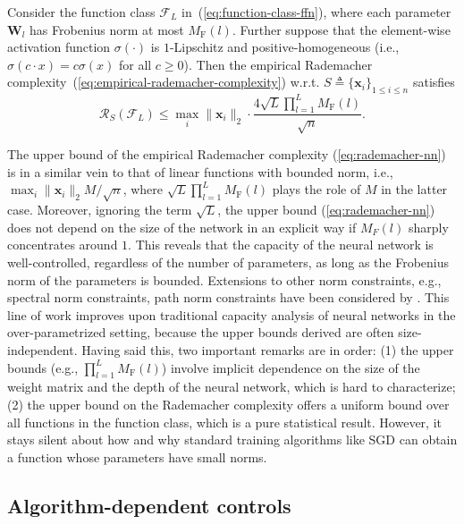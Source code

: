\begin{thm}Consider the
function class $\mathcal{F}_{L}$ in~(\ref{eq:function-class-ffn}),
where each parameter $\bm{W}_{l}$ has Frobenius norm at most $M_{\mathrm{F}}(l)$.
Further suppose that the element-wise activation function $\sigma(\cdot)$
is $1$-Lipschitz and positive-homogeneous (i.e., $\sigma(c\cdot x)=c\sigma(x)$
for all $c\geq0$). Then the empirical Rademacher complexity~(\ref{eq:empirical-rademacher-complexity})
w.r.t. $S\triangleq\{\bm{x}_{i}\}_{1 \leq i \leq n}$ satisfies
\begin{equation}
\mathcal{R}_{S}\left(\mathcal{F}_{L}\right)\leq\max_{i}\|\bm{x}_{i}\|_{2}\cdot\frac{4\sqrt{L}\prod_{l=1}^{L}M_{\mathrm{F}}(l)}{\sqrt{n}}.\label{eq:rademacher-nn}
\end{equation}
\end{thm}The upper bound of the empirical Rademacher complexity
(\ref{eq:rademacher-nn}) is in a similar vein to that of linear functions
with bounded norm, i.e., $\max_{i}\|\bm{x}_{i}\|_{2}M/\sqrt{n}$,
where $\sqrt{L}\prod_{l=1}^{L}M_{\mathrm{F}}(l)$ plays the role of
$M$ in the latter case. Moreover, ignoring the term $\sqrt{L}$,
the upper bound (\ref{eq:rademacher-nn}) does not depend on the size
of the network in an explicit way  if $M_F(l)$ sharply concentrates around $1$. This reveals that the capacity
of the neural network is well-controlled, regardless of the number
of parameters, as long as the Frobenius norm of the parameters is
bounded. Extensions to other norm constraints, e.g., spectral norm
constraints, path norm constraints have been considered by \cite{neyshabur2015norm,NIPS2017_7204,li2018tighter,klusowski2016risk, E19}.
This line of work improves upon traditional capacity analysis of neural
networks in the over-parametrized setting, because the upper bounds derived are often size-independent.
Having said this, two important remarks are in order: (1) the upper bounds (e.g., $\prod_{l=1}^{L}M_{\mathrm{F}}(l)$)
involve implicit dependence on the size of the weight matrix and
the depth of the neural network, which is hard to characterize; (2) the upper bound on the Rademacher complexity offers a uniform bound
over all functions in the function class, which is a pure statistical
result. However, it stays silent about how and why standard training
algorithms like SGD can obtain a function whose parameters have small
norms.

\subsection{Algorithm-dependent controls}

